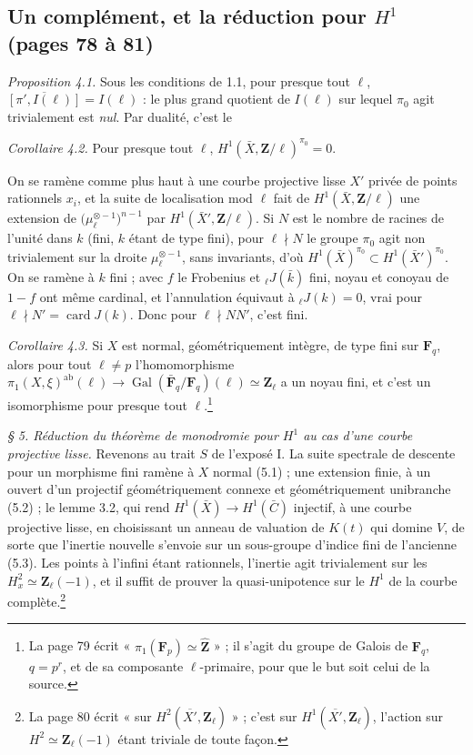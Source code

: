\documentclass[11pt,a4paper]{article}
\begin{document}
\subsection*{Un complément, et la réduction pour $H^1$ (pages 78 à 81)}

\emph{Proposition 4.1.} Sous les conditions de 1.1, pour presque tout $\ell$,
$\overline{[\pi', I(\ell)]} = I(\ell)$ : le plus grand quotient de $I(\ell)$ sur
lequel $\pi_0$ agit trivialement est \emph{nul}. Par dualité, c'est le

\emph{Corollaire 4.2.} Pour presque tout $\ell$, $H^1(\bar X, \mathbf{Z}/\ell)^{\pi_0} = 0$.

On se ramène comme plus haut à une courbe projective lisse $X'$ privée de points
rationnels $x_i$, et la suite de localisation mod $\ell$ fait de
$H^1(\bar X, \mathbf{Z}/\ell)$ une extension de
$\bigl(\mu_\ell^{\otimes -1}\bigr)^{n-1}$ par $H^1(\bar X', \mathbf{Z}/\ell)$. Si
$N$ est le nombre de racines de l'unité dans $k$ (fini, $k$ étant de type fini),
pour $\ell \nmid N$ le groupe $\pi_0$ agit non trivialement sur la droite
$\mu_\ell^{\otimes -1}$, sans invariants, d'où $H^1(\bar X)^{\pi_0} \subset
H^1(\bar X')^{\pi_0}$. On se ramène à $k$ fini ; avec $f$ le Frobenius et
${}_\ell J(\bar k)$ fini, noyau et conoyau de $1 - f$ ont même cardinal, et
l'annulation équivaut à ${}_\ell J(k) = 0$, vrai pour $\ell \nmid N' =
\operatorname{card} J(k)$. Donc pour $\ell \nmid NN'$, c'est fini.

\emph{Corollaire 4.3.} Si $X$ est normal, géométriquement intègre, de type fini
sur $\mathbf{F}_q$, alors pour tout $\ell \neq p$ l'homomorphisme
$\pi_1(X,\xi)^{\mathrm{ab}}(\ell) \to \operatorname{Gal}(\bar{\mathbf{F}}_q /
\mathbf{F}_q)(\ell) \simeq \mathbf{Z}_\ell$ a un noyau fini, et c'est un
isomorphisme pour presque tout $\ell$.\footnote{La page 79 écrit
« $\pi_1(\mathbf{F}_p) \simeq \widehat{\mathbf{Z}}$ » ; il s'agit du groupe de
Galois de $\mathbf{F}_q$, $q = p^r$, et de sa composante $\ell$-primaire,
pour que le but soit celui de la source.}

\emph{§ 5. Réduction du théorème de monodromie pour $H^1$ au cas d'une courbe
projective lisse.} Revenons au trait $S$ de l'exposé I. La suite spectrale de
descente pour un morphisme fini ramène à $X$ normal (5.1) ; une extension finie,
à un ouvert d'un projectif géométriquement connexe et géométriquement unibranche
(5.2) ; le lemme 3.2, qui rend $H^1(\bar X) \to H^1(\bar C)$ injectif, à une
courbe projective lisse, en choisissant un anneau de valuation de $K(t)$ qui
domine $V$, de sorte que l'inertie nouvelle s'envoie sur un sous-groupe d'indice
fini de l'ancienne (5.3). Les points à l'infini étant rationnels, l'inertie agit
trivialement sur les $H^2_x \simeq \mathbf{Z}_\ell(-1)$, et il suffit de prouver
la quasi-unipotence sur le $H^1$ de la courbe complète.\footnote{La page 80
écrit « sur $H^2(\overline{X'}, \mathbf{Z}_\ell)$ » ; c'est sur
$H^1(\overline{X'}, \mathbf{Z}_\ell)$, l'action sur $H^2 \simeq
\mathbf{Z}_\ell(-1)$ étant triviale de toute façon.}
\end{document}
